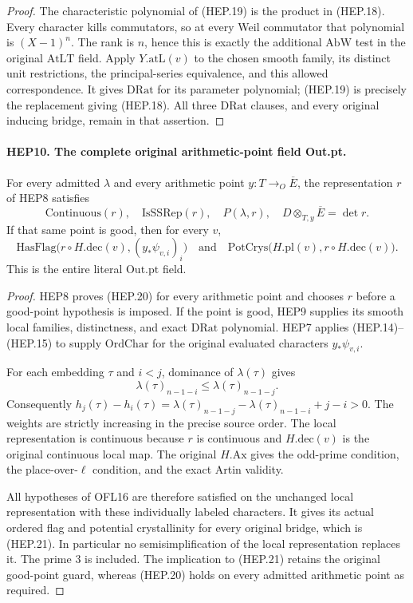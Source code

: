 \documentclass[11pt,a4paper]{article}
\numberwithin{equation}{section}
\theoremstyle{remark}\newtheorem{remark}[theorem]{Remark}
\begin{document}
\begin{proof}
The characteristic polynomial of (HEP.19) is the product in
(HEP.18).  Every character kills commutators, so at every Weil
commutator that polynomial is $(X-1)^n$.  The rank is $n$,
hence this is exactly the additional $\mathrm{AbW}$ test in
the original $\mathrm{AtLT}$ field.  Apply $Y.\mathrm{atL}(v)$
to the chosen smooth family, its distinct unit restrictions,
the principal-series equivalence, and this allowed correspondence.
It gives $\mathrm{DRat}$ for its parameter polynomial; (HEP.19)
is precisely the replacement giving (HEP.18).  All three
$\mathrm{DRat}$ clauses, and every original inducing bridge,
remain in that assertion.
\end{proof}

\paragraph{HEP10. The complete original arithmetic-point field Out.pt.}
\label{claim:HEP10}
For every admitted $\lambda$ and every arithmetic point
$y:T\to_O\overline E$, the representation $r$ of HEP8 satisfies
\[
 \mathrm{Continuous}(r),\quad \mathrm{IsSSRep}(r),\quad
 P(\lambda,r),\quad D\otimes_{T,y}\overline E=\det r.
 \tag{HEP.20}
\]
If that same point is good, then for every $v$,
\[
 \mathrm{HasFlag}\bigl(r\circ H.\mathrm{dec}(v),
                                  (y_*\psi_{v,i})_i\bigr)
       \quad\text{and}\quad
 \mathrm{PotCrys}\bigl(H.\mathrm{pl}(v),r\circ H.\mathrm{dec}(v)\bigr).
 \tag{HEP.21}
\]
This is the entire literal $\mathrm{Out.pt}$ field.
\begin{proof}
HEP8 proves (HEP.20) for every arithmetic point and chooses $r$
before a good-point hypothesis is imposed.  If the point is good,
HEP9 supplies its smooth local families, distinctness, and exact
$\mathrm{DRat}$ polynomial.  HEP7 applies (HEP.14)--(HEP.15)
to supply $\mathrm{OrdChar}$ for the original evaluated characters
$y_*\psi_{v,i}$.

For each embedding $\tau$ and $i<j$, dominance of $\lambda(\tau)$
gives
\[
 \lambda(\tau)_{n-1-i}\leq\lambda(\tau)_{n-1-j}.
\]
Consequently
$h_j(\tau)-h_i(\tau)
 =\lambda(\tau)_{n-1-j}-\lambda(\tau)_{n-1-i}+j-i>0$.
The weights are strictly increasing in the precise source order.
The local representation is continuous because $r$ is continuous
and $H.\mathrm{dec}(v)$ is the original continuous local map.
The original $H.\mathrm{Ax}$ gives the odd-prime condition,
the place-over-$\ell$ condition, and the exact Artin validity.

All hypotheses of OFL16 are therefore satisfied on the unchanged
local representation with these individually labeled characters.
It gives its actual ordered flag and potential crystallinity for
every original bridge, which is (HEP.21).  In particular no
semisimplification of the local representation replaces it.
The prime $3$ is included.  The implication to (HEP.21) retains
the original good-point guard, whereas (HEP.20) holds on every
admitted arithmetic point as required.
\end{proof}
\end{document}
